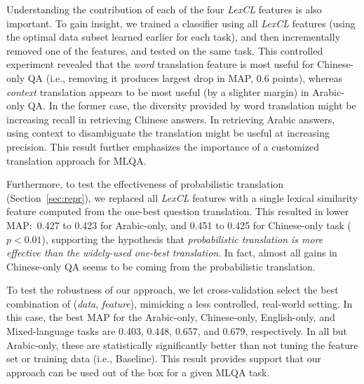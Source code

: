 \documentclass{sig-alternate-05-2015}
\begin{document}

Understanding the contribution of each of the four \emph{LexCL} features is also important. To gain insight, we 
trained a classifier using all {\em LexCL} features (using the optimal data subset learned earlier for each task), and then 
incrementally removed one of the features, and tested on the same task. 
This controlled experiment revealed that the \emph{word} translation feature is most useful for Chinese-only 
QA (i.e., removing it produces largest drop in MAP, 0.6 points), whereas \emph{context} translation appears 
to be most useful (by a slighter margin) in Arabic-only QA. In the former case, the diversity provided by
word translation might be increasing recall in retrieving Chinese answers. In retrieving Arabic
answers, using context to disambiguate the translation might be useful at increasing precision. This result
further emphasizes the importance of a customized translation approach for MLQA.

Furthermore, to test the effectiveness of probabilistic translation (Section~\ref{sec:repr}), we replaced all 
{\em LexCL} features with a single lexical similarity feature computed from the one-best question translation. 
This resulted in lower MAP:\ 0.427 to 0.423 for Arabic-only, and 0.451 to 0.425 for Chinese-only task ($p < 0.01$), 
supporting the hypothesis that \emph{probabilistic translation is more effective than the widely-used 
one-best translation}. In fact, almost all gains in Chinese-only QA seems to be coming from the
probabilistic translation.

To test the robustness of our approach, we let cross-validation select the best combination of 
(\emph{data}, \emph{feature}), mimicking a less controlled, real-world setting. In this case, the best 
MAP for the Arabic-only, Chinese-only, English-only, and Mixed-language tasks are 0.403, 0.448, 0.657, and 
0.679, respectively. In all but Arabic-only, these are statistically significantly better than 
not tuning the feature set or training data (i.e., Baseline). This result provides support that our approach
can be used out of the box for a given MLQA task.
\end{document}
